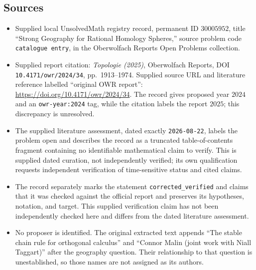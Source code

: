 \documentclass[11pt]{article}
\begin{document}
\subsection{Sources}
\begin{itemize}
\item Supplied local UnsolvedMath registry record, permanent ID \(30005952\), title ``Strong Geography for Rational Homology Spheres,'' source problem code \texttt{catalogue entry}, in the Oberwolfach Reports Open Problems collection.
\item Supplied report citation: \emph{Topologie (2025)}, Oberwolfach Reports, DOI \texttt{10.4171/owr/2024/34}, pp.\ 1913--1974. Supplied source URL and literature reference labelled ``original OWR report'': \url{https://doi.org/10.4171/owr/2024/34}. The record gives proposed year \(2024\) and an \texttt{owr-year:2024} tag, while the citation labels the report \(2025\); this discrepancy is unresolved.
\item The supplied literature assessment, dated exactly \texttt{2026-08-22}, labels the problem open and describes the record as a truncated table-of-contents fragment containing no identifiable mathematical claim to verify. This is supplied dated curation, not independently verified; its own qualification requests independent verification of time-sensitive status and cited claims.
\item The record separately marks the statement \texttt{corrected\_verified} and claims that it was checked against the official report and preserves its hypotheses, notation, and target. This supplied verification claim has not been independently checked here and differs from the dated literature assessment.
\item No proposer is identified. The original extracted text appends ``The stable chain rule for orthogonal calculus'' and ``Connor Malin (joint work with Niall Taggart)'' after the geography question. Their relationship to that question is unestablished, so those names are not assigned as its authors.
\end{itemize}
\end{document}
